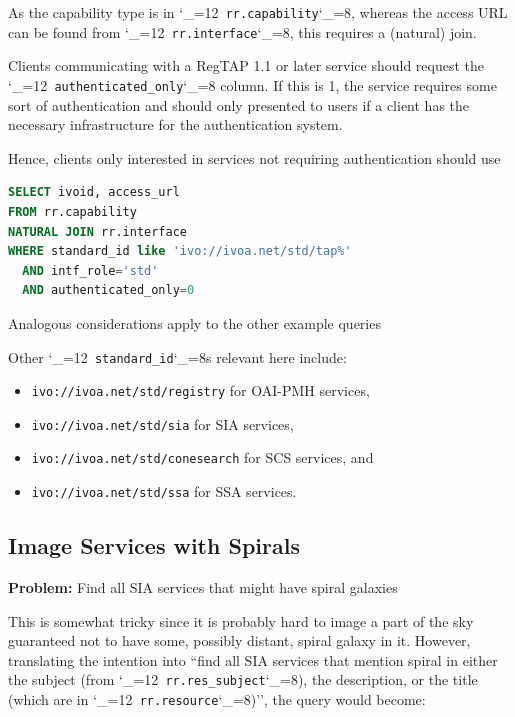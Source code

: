 \documentclass[11pt,a4paper]{ivoa}
\makeatletter
\def\rtent#1{\texttt{\color{rtcolor}\verb|#1|}}
\def\makeunderscoreletter{\catcode`\_=12}
\def\makeunderscoresubscript{\catcode`\_=8}
\def\rtent{\makeunderscoreletter\relax\rt@nt}
\def\rt@nt#1{\texttt{\color{rtcolor} #1}\makeunderscoresubscript{}}
\makeatother
\begin{document}
As the capability type is in
\rtent{rr.capability}, whereas the access URL can be
found from
\rtent{rr.interface}, this requires
a (natural) join.

Clients communicating with a RegTAP 1.1 or later service should request the
\rtent{authenticated_only} column.  If this is 1, the service
requires some sort of authentication and should only presented to users
if a client has the necessary infrastructure for the authentication
system.

Hence, clients only interested in services not requiring authentication should
use

\begin{lstlisting}[language=SQL,flexiblecolumns=true]
SELECT ivoid, access_url
FROM rr.capability
NATURAL JOIN rr.interface
WHERE standard_id like 'ivo://ivoa.net/std/tap%'
  AND intf_role='std'
  AND authenticated_only=0
\end{lstlisting}

Analogous considerations apply to the other example queries

Other \rtent{standard_id}s relevant here include:


\begin{itemize}

\item \texttt{ivo://ivoa.net/std/registry} for OAI-PMH services,{}

\item \texttt{ivo://ivoa.net/std/sia} for SIA services,{}

\item \texttt{ivo://ivoa.net/std/conesearch} for SCS services,
and{}

\item \texttt{ivo://ivoa.net/std/ssa} for SSA services.{}

\end{itemize}

\subsection{Image Services with Spirals}

\textbf{Problem:} Find all SIA services that might have spiral
galaxies

This is somewhat tricky since it is probably hard to image a part
of the sky guaranteed not to have some, possibly distant, spiral galaxy
in it.  However, translating the intention into ``find all SIA services
that mention spiral in either the subject (from
\rtent{rr.res_subject}), the description, or the
title (which are in
\rtent{rr.resource})'',
the query would become:
\end{document}
